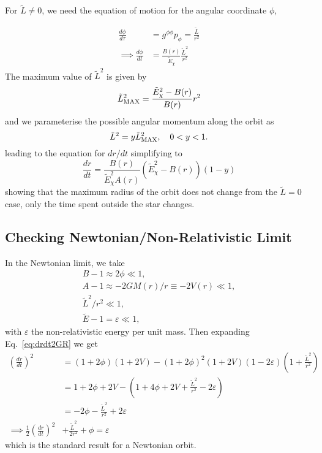 For $\tilde L \neq 0$, we need the equation of motion for the angular coordinate $\phi$,

\begin{align}
    \frac{d \phi}{d\tau } & = g^{\phi\phi}p_\phi = \frac{\tilde L}{r^2}\\
    \implies \frac{d\phi}{dt} & = \frac{B(r)}{\tilde E_\chi}\frac{\tilde L^2}{r^2}
\end{align}
The maximum value of  $\tilde L^2$ is  given by
\begin{equation}
    \tilde L^2_{\rm MAX} = \frac{ \tilde E_\chi^2 - B(r)}{B(r)}r^2
\end{equation}
and we parameterise the possible angular momentum along the orbit as 
\begin{equation}
    \tilde L^2 = y \tilde L^2_{\rm MAX} ,\quad 0<y<1.
\end{equation}
leading to the equation for $dr/dt$ simplifying to 
\begin{equation}
    \frac{dr}{dt} = \frac{B(r)}{\tilde E_\chi^2 A(r)}\left( \tilde E_\chi^2 - B(r) \right)(1 - y)
\end{equation}
showing that the maximum radius of the orbit does not change from the $\tilde L = 0$ case, only the time spent outside the star changes.


\subsection{Checking Newtonian/Non-Relativistic Limit}

In the Newtonian limit, we take 
\begin{align}
B - 1\approx2 \phi \ll 1,\\
A - 1 \approx - 2 G M(r) / r \equiv -2V(r)\ll 1,\\
\tilde L^2 /r^2 \ll 1,\\
\tilde E - 1 = \varepsilon \ll 1,
\end{align}
with $\varepsilon$ the non-relativistic energy per unit mass. Then expanding Eq.~\ref{eq:drdt2GR} we get
\begin{align}
    \left(\frac{dr}{dt}\right)^2 & = (1 + 2 \phi)(1 + 2V) - (1 + 2\phi)^2(1 + 2 V)(1 - 2 \varepsilon)\left(1 + \frac{\tilde L^2}{r^2}\right)\\
    & = 1 + 2 \phi + 2 V - \left(1 + 4 \phi + 2 V + \frac{\tilde L^2}{r^2} - 2 \varepsilon \right)\\
    & = -2 \phi - \frac{\tilde L^2}{r^2} + 2 \varepsilon\\
    \implies \frac{1}{2}\left(\frac{dr}{dt}\right)^2 & +\frac{\tilde L^2}{ 2 r^2} + \phi = \varepsilon
\end{align}
which is the standard result for a Newtonian orbit.

